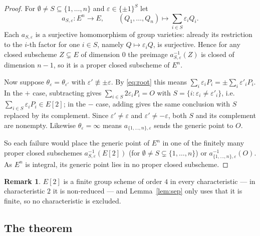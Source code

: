 \documentclass[11pt,a4paper]{article}
\theoremstyle{plain}
\theoremstyle{definition}
\newtheorem{remark}[theorem]{Remark}
\newcommand{\eps}{\varepsilon}
\begin{document}
\begin{proof}
For $\emptyset \neq S \subseteq \{1,\dots,n\}$ and $\eps \in \{\pm 1\}^{S}$ let
\[
  a_{S,\eps} \colon E^n \longrightarrow E, \qquad
  (Q_1,\dots,Q_n) \longmapsto \sum_{i \in S} \eps_i Q_i .
\]
Each $a_{S,\eps}$ is a surjective homomorphism of group varieties: already its
restriction to the $i$-th factor for one $i \in S$, namely $Q \mapsto \eps_i Q$,
is surjective. Hence for any closed subscheme $Z \subsetneq E$ of dimension $0$
the preimage $a_{S,\eps}^{-1}(Z)$ is closed of dimension $n-1$, so it is a proper
closed subscheme of $E^n$.

Now suppose $\theta_{\eps} = \theta_{\eps'}$ with $\eps' \not\equiv \pm\eps$. By
\eqref{eq:root} this means $\sum_i \eps_i P_i = \pm \sum_i \eps'_i P_i$. In the
$+$ case, subtracting gives $\sum_{i \in S} 2\eps_i P_i = O$ with
$S = \{ i : \eps_i \neq \eps'_i \}$, i.e. $\sum_{i \in S} \eps_i P_i \in E[2]$; in
the $-$ case, adding gives the same conclusion with $S$ replaced by its
complement. Since $\eps' \neq \eps$ and $\eps' \neq -\eps$, both $S$ and its
complement are nonempty. Likewise $\theta_{\eps} = \infty$ means
$a_{\{1,\dots,n\},\eps}$ sends the generic point to $O$.

So each failure would place the generic point of $E^n$ in one of the finitely
many proper closed subschemes $a_{S,\eps}^{-1}(E[2])$ (for $\emptyset \neq S
\subsetneq \{1,\dots,n\}$) or $a_{\{1,\dots,n\},\eps}^{-1}(O)$. As $E^n$ is
integral, its generic point lies in no proper closed subscheme.
\end{proof}

\begin{remark}
$E[2]$ is a finite group scheme of order $4$ in every characteristic --- in
characteristic $2$ it is non-reduced --- and Lemma~\ref{lem:sep} only uses that it
is finite, so no characteristic is excluded.
\end{remark}

\subsection{The theorem}
\end{document}
